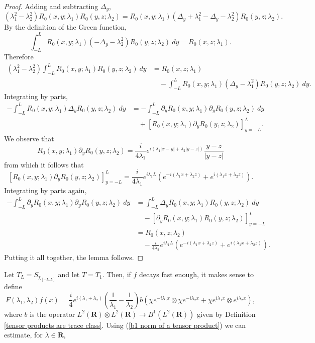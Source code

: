 \documentclass[12pt]{report}
\newcommand{\RR}{\mathbf{R}}
\theoremstyle{definition}
\begin{document}
\begin{proof}
Adding and subtracting $\Delta_y$,
$$(\lambda_1^2 - \lambda_2^2)R_0(x, y; \lambda_1)R_0(y, z; \lambda_2) = R_0(x, y; \lambda_1)(\Delta_y + \lambda_1^2 - \Delta_y - \lambda_2^2)R_0(y, z; \lambda_2).$$
By the definition of the Green function,
$$\int_{-L}^L R_0(x, y; \lambda_1)(-\Delta_y - \lambda_2^2)R_0(y, z; \lambda_2) ~dy = R_0(x, z; \lambda_1).$$
Therefore
\begin{align*}
  (\lambda_1^2 - \lambda_2^2)\int_{-L}^L R_0(x, y; \lambda_1)R_0(y, z; \lambda_2) ~dy &= R_0(x, z; \lambda_1)\\
  &\quad-\int_{-L}^L R_0(x, y;\lambda_1)(\Delta_y - \lambda_1^2)R_0(y, z; \lambda_2) ~dy.
\end{align*}
Integrating by parts,
\begin{align*}
  -\int_{-L}^L R_0(x, y; \lambda_1)\Delta_y R_0(y, z; \lambda_2) ~dy &= -\int_{-L}^L \partial_yR_0(x, y; \lambda_1)\partial_y R_0(y, z; \lambda_2) ~dy\\
    &\quad+ [R_0(x, y; \lambda_1)\partial_y R_0(y, z; \lambda_2)]_{y=-L}^L.
\end{align*}
We observe that
$$R_0(x, y; \lambda_1)\partial_y R_0(y, z; \lambda_2) = \frac{i}{4\lambda_1}e^{i(\lambda_1|x-y|+\lambda_2|y-z|)}\frac{y-z}{|y-z|}$$
from which it follows that
$$[R_0(x, y; \lambda_1)\partial_y R_0(y, z; \lambda_2)]_{y=-L}^L = \frac{i}{4\lambda_1} e^{i\lambda_1L}(e^{-i(\lambda_1x + \lambda_2z)} + e^{i(\lambda_1x + \lambda_2z)}).$$
Integrating by parts again,
\begin{align*}
  -\int_{-L}^L \partial_yR_0(x, y; \lambda_1)\partial_y R_0(y, z; \lambda_2) ~dy &= \int_{-L}^L \Delta_yR_0(x, y; \lambda_1)R_0(y, z; \lambda_2) ~dy\\
  &\quad- [\partial_yR_0(x, y; \lambda_1) R_0(y, z; \lambda_2)]_{y=-L}^L\\
  &= R_0(x, z; \lambda_2) \\
  &\quad- \frac{i}{4\lambda_2} e^{i\lambda_1L}(e^{-i(\lambda_1x + \lambda_2z)} + e^{i(\lambda_1x + \lambda_2z)}).
\end{align*}
Putting it all together, the lemma follows.
\end{proof}
Let $T_L = S_{\chi_{[-L, L]}}$ and let $T = T_1$. Then, if $f$ decays fast enough, it makes sense to define
$$F(\lambda_1, \lambda_2)f(x) = \frac{i}{4}e^{i(\lambda_1 + \lambda_2)}\left(\frac{1}{\lambda_1} - \frac{1}{\lambda_2}\right)b(\chi e^{-i\lambda_1x} \otimes \chi e^{-i\lambda_2x} + \chi e^{i\lambda_1x} \otimes e^{i\lambda_2x}),$$
where $b$ is the operator $L^2(\RR) \otimes L^2(\RR) \to B^1(L^2(\RR))$ given by Definition \ref{tensor products are trace class}. Using (\ref{b1 norm of a tensor product}) we can estimate, for $\lambda \in \RR$,
\end{document}
